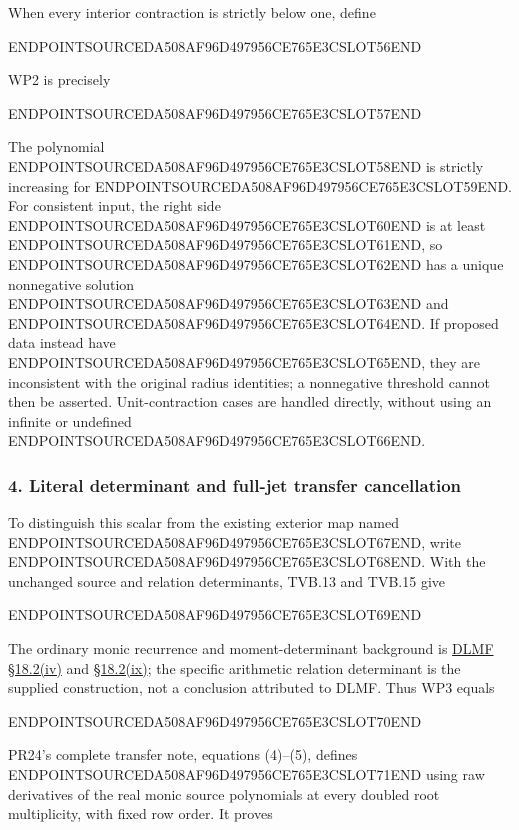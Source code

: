 When every interior contraction is strictly below one, define

ENDPOINTSOURCEDA508AF96D497956CE765E3CSLOT56END

WP2 is precisely

ENDPOINTSOURCEDA508AF96D497956CE765E3CSLOT57END

The polynomial ENDPOINTSOURCEDA508AF96D497956CE765E3CSLOT58END is strictly increasing for ENDPOINTSOURCEDA508AF96D497956CE765E3CSLOT59END. For consistent input, the right side ENDPOINTSOURCEDA508AF96D497956CE765E3CSLOT60END is at least ENDPOINTSOURCEDA508AF96D497956CE765E3CSLOT61END, so ENDPOINTSOURCEDA508AF96D497956CE765E3CSLOT62END has a unique nonnegative solution ENDPOINTSOURCEDA508AF96D497956CE765E3CSLOT63END and ENDPOINTSOURCEDA508AF96D497956CE765E3CSLOT64END. If proposed data instead have ENDPOINTSOURCEDA508AF96D497956CE765E3CSLOT65END, they are inconsistent with the original radius identities; a nonnegative threshold cannot then be asserted. Unit-contraction cases are handled directly, without using an infinite or undefined ENDPOINTSOURCEDA508AF96D497956CE765E3CSLOT66END.

\subsubsection{4. Literal determinant and full-jet transfer cancellation}\label{endpoint-window_product_owner--literal-determinant-and-full-jet-transfer-cancellation}

To distinguish this scalar from the existing exterior map named ENDPOINTSOURCEDA508AF96D497956CE765E3CSLOT67END, write ENDPOINTSOURCEDA508AF96D497956CE765E3CSLOT68END. With the unchanged source and relation determinants, TVB.13 and TVB.15 give

ENDPOINTSOURCEDA508AF96D497956CE765E3CSLOT69END

The ordinary monic recurrence and moment-determinant background is \href{https://dlmf.nist.gov/18.2.iv}{DLMF §18.2(iv)} and \href{https://dlmf.nist.gov/18.2.ix}{§18.2(ix)}; the specific arithmetic relation determinant is the supplied construction, not a conclusion attributed to DLMF. Thus WP3 equals

ENDPOINTSOURCEDA508AF96D497956CE765E3CSLOT70END

PR24's complete transfer note, equations (4)--(5), defines ENDPOINTSOURCEDA508AF96D497956CE765E3CSLOT71END using raw derivatives of the real monic source polynomials at every doubled root multiplicity, with fixed row order. It proves

